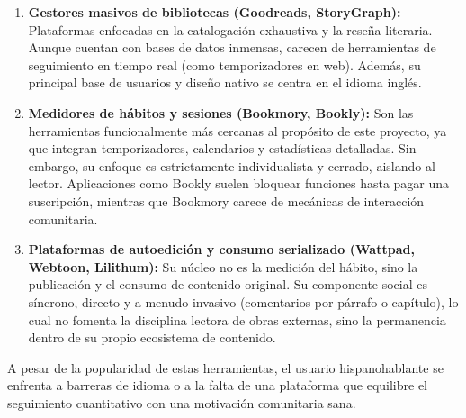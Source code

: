 \documentclass[12pt, atypical, journal]{article}
\begin{document}
\begin{enumerate}
    \item \textbf{Gestores masivos de bibliotecas (Goodreads, StoryGraph):} Plataformas enfocadas en la catalogación exhaustiva y la reseña literaria. Aunque cuentan con bases de datos inmensas, carecen de herramientas de seguimiento en tiempo real (como temporizadores en web). Además, su principal base de usuarios y diseño nativo se centra en el idioma inglés.
    \item \textbf{Medidores de hábitos y sesiones (Bookmory, Bookly):} Son las herramientas funcionalmente más cercanas al propósito de este proyecto, ya que integran temporizadores, calendarios y estadísticas detalladas. Sin embargo, su enfoque es estrictamente individualista y cerrado, aislando al lector. Aplicaciones como Bookly suelen bloquear funciones hasta pagar una suscripción, mientras que Bookmory carece de mecánicas de interacción comunitaria.
    \item \textbf{Plataformas de autoedición y consumo serializado (Wattpad, Webtoon, Lilithum):} Su núcleo no es la medición del hábito, sino la publicación y el consumo de contenido original. Su componente social es síncrono, directo y a menudo invasivo (comentarios por párrafo o capítulo), lo cual no fomenta la disciplina lectora de obras externas, sino la permanencia dentro de su propio ecosistema de contenido.
\end{enumerate}

A pesar de la popularidad de estas herramientas, el usuario hispanohablante se enfrenta a barreras de idioma o a la falta de una plataforma que equilibre el seguimiento cuantitativo con una motivación comunitaria sana.

\begin{table}[htpb]
\centering
\caption{Análisis comparativo de plataformas de gestión y fomento de lectura}
\label{tab:comparativa_apps}
\end{table}
\end{document}

